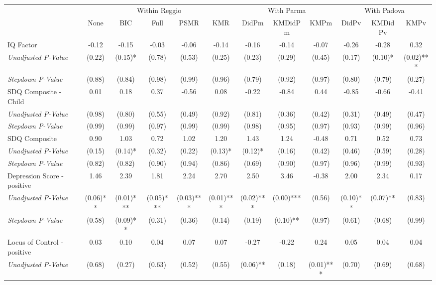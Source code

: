 \begin{tabular}{l c c c c c c c c c c c}
\toprule
& \multicolumn{5}{c}{Within Reggio} & \multicolumn{3}{c}{With Parma} & \multicolumn{3}{c}{With Padova} \\\cmidrule(lr){2-6} \cmidrule(lr){7-9} \cmidrule(lr){10-12}
 & None & BIC & Full & PSMR & KMR & DidPm & KMDidPm & KMPm & DidPv & KMDidPv & KMPv \\
\midrule
IQ Factor & -0.12 & -0.15 & -0.03 & -0.06 & -0.14 & -0.16 & -0.14 & -0.07 & -0.26 & -0.28 & 0.32 \\
\quad \textit{Unadjusted P-Value} & (0.22) & (0.15)* & (0.78) & (0.53) & (0.25) & (0.23) & (0.29) & (0.45) & (0.17) & (0.10)* & (0.02)*** \\
\quad \textit{Stepdown P-Value} & (0.88) & (0.84) & (0.98) & (0.99) & (0.96) & (0.79) & (0.92) & (0.97) & (0.80) & (0.79) & (0.27) \\
SDQ Composite - Child & 0.01 & 0.18 & 0.37 & -0.56 & 0.08 & -0.22 & -0.84 & 0.44 & -0.85 & -0.66 & -0.41 \\
\quad \textit{Unadjusted P-Value} & (0.98) & (0.80) & (0.55) & (0.49) & (0.92) & (0.81) & (0.36) & (0.42) & (0.31) & (0.49) & (0.47) \\
\quad \textit{Stepdown P-Value} & (0.99) & (0.99) & (0.97) & (0.99) & (0.99) & (0.98) & (0.95) & (0.97) & (0.93) & (0.99) & (0.96) \\
SDQ Composite & 0.90 & 1.03 & 0.72 & 1.02 & 1.20 & 1.43 & 1.24 & -0.48 & 0.71 & 0.52 & 0.73 \\
\quad \textit{Unadjusted P-Value} & (0.15) & (0.14)* & (0.32) & (0.22) & (0.13)* & (0.12)* & (0.16) & (0.42) & (0.46) & (0.59) & (0.28) \\
\quad \textit{Stepdown P-Value} & (0.82) & (0.82) & (0.90) & (0.94) & (0.86) & (0.69) & (0.90) & (0.97) & (0.96) & (0.99) & (0.93) \\
Depression Score - positive & 1.46 & 2.39 & 1.81 & 2.24 & 2.70 & 2.50 & 3.46 & -0.38 & 2.00 & 2.34 & 0.17 \\
\quad \textit{Unadjusted P-Value} & (0.06)** & (0.01)*** & (0.05)*** & (0.03)*** & (0.01)*** & (0.02)*** & (0.00)*** & (0.56) & (0.10)** & (0.07)** & (0.83) \\
\quad \textit{Stepdown P-Value} & (0.58) & (0.09)** & (0.31) & (0.36) & (0.14) & (0.19) & (0.10)** & (0.97) & (0.61) & (0.68) & (0.99) \\
Locus of Control - positive & 0.03 & 0.10 & 0.04 & 0.07 & 0.07 & -0.27 & -0.22 & 0.24 & 0.05 & 0.04 & 0.04 \\
\quad \textit{Unadjusted P-Value} & (0.68) & (0.27) & (0.63) & (0.52) & (0.55) & (0.06)** & (0.18) & (0.01)*** & (0.70) & (0.69) & (0.68) \\

\end{tabular}
